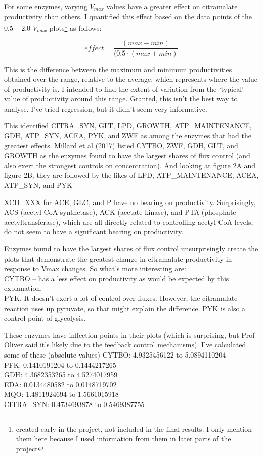 \documentclass[parskip=full]{scrreprt}
\begin{document}
For some enzymes, varying $V_{max}$ values have a greater effect on citramalate productivity than others. I quantified this effect based on the data points of the 0.5 -- 2.0 $V_{max}$ plots\footnote{created early in the project, not included in the final results. I only mention them here because I used information from them in later parts of the project} as follows:

\[
effect = \frac{(max - min)}{(0.5 \cdot (max + min)}
\]

This is the difference between the maximum and minimum productivities obtained over the range, relative to the average, which represents where the value of productivity is. I intended to find the extent of variation from the `typical' value of productivity around this range. Granted, this isn’t the best way to analyse. I’ve tried regression, but it didn’t seem very informative.

This identified CITRA\_SYN, GLT, LPD, GROWTH, ATP\_MAINTENANCE, GDH, ATP\_SYN, ACEA, PYK, and ZWF as among the enzymes that had the greatest effects. Millard et al (2017) listed CYTBO, ZWF, GDH, GLT, and GROWTH as the enzymes found to have the largest shares of flux control (and also exert the strongest controls on concentration). And looking at figure 2A and figure 2B, they are followed by the likes of LPD, ATP\_MAINTENANCE, ACEA, ATP\_SYN, and PYK

XCH\_XXX for ACE, GLC, and P have no bearing on productivity. Surprisingly, ACS (acetyl CoA synthetase), ACK (acetate kinase), and PTA (phosphate acetyltransferase), which are all directly related to controlling acetyl CoA levels, do not seem to have a significant bearing on productivity.

Enzymes found to have the largest shares of flux control unsurprisingly create the plots that demonstrate the greatest change in citramalate productivity in response to Vmax changes. So what's more interesting are:\\
CYTBO -- has a less effect on productivity as would be expected by this explanation.\\
PYK. It doesn't exert a lot of control over fluxes. However, the citramalate reaction uses up pyruvate, so that might explain the difference. PYK is also a control point of glycolysis.

These enzymes have inflection points in their plots (which is surprising, but Prof Oliver said it’s likely due to the feedback control mechanisms). I’ve calculated some of these (absolute values)
CYTBO: 4.9325456122 to 5.0894110204\\
PFK: 0.1410191204 to 0.1444217265\\
GDH: 4.3682353265 to 4.5274017959\\
EDA: 0.0134480582 to 0.0148719702\\
MQO: 1.4811924694 to 1.5661015918\\
CITRA\_SYN: 0.4734693878 to 0.5469387755
\end{document}
